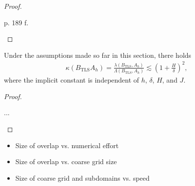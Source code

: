 \begin{proof}
  \begin{todo}
    p. 189 f.
  \end{todo}
\end{proof}

\begin{theorem}
  \label{theorem:schwarz:two-level-convergence}
  Under the assumptions made so far in this section, there holds
  \begin{gather}
    \label{eq:schwarz:14}
    \kappa(B_{\text{TLS}} A_h)
    = \frac{\lambda(B_{\text{TLS}}, A_h)}{\Lambda(B_{\text{TLS}},
      A_h)}
    \lesssim \left(1+\frac H\delta\right)^2,
  \end{gather}
  where the implicit constant is independent of $h$, $\delta$, $H$, and $J$.
\end{theorem}

\begin{proof}
  \begin{todo}
    ...
  \end{todo}
\end{proof}

\begin{remark}
  \begin{todo}
    \begin{itemize}
    \item Size of overlap vs. numerical effort
    \item Size of overlap vs. coarse grid size
    \item Size of coarse grid and subdomains vs. speed
    \end{itemize}
  \end{todo}
\end{remark}

